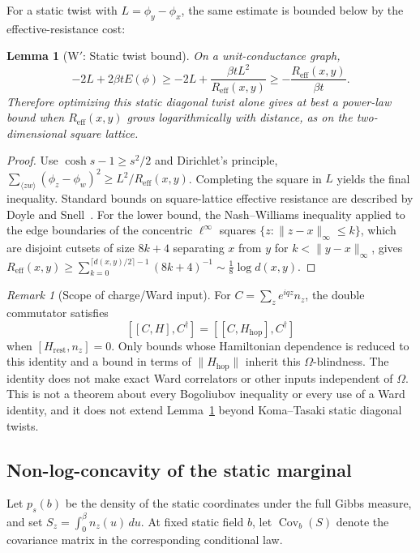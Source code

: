 \documentclass[11pt]{article}
\newtheorem{lemma}[theorem]{Lemma}
\theoremstyle{definition}
\theoremstyle{remark}
\newtheorem{remark}[theorem]{Remark}
\newcommand{\eff}{\mathrm{eff}}
\begin{document}
For a static twist with $L=\phi_y-\phi_x$, the same estimate is bounded below by the effective-resistance cost:
\begin{lemma}[W$'$: Static twist bound]\label{lem:Wprime}
On a unit-conductance graph,
\[
 -2L+2\beta tE(\phi)
 \geq -2L+\frac{\beta tL^2}{R_{\eff}(x,y)}
 \geq-\frac{R_{\eff}(x,y)}{\beta t}.
\]
Therefore optimizing this static diagonal twist alone gives at best a power-law bound when $R_{\eff}(x,y)$ grows logarithmically with distance, as on the two-dimensional square lattice.
\end{lemma}

\begin{proof}
Use $\cosh s-1\geq s^2/2$ and Dirichlet's principle, $\sum_{\langle zw\rangle}(\phi_z-\phi_w)^2\geq L^2/R_{\eff}(x,y)$. Completing the square in $L$ yields the final inequality. Standard bounds on square-lattice effective resistance are described by Doyle and Snell~\cite{doyleSnell}. For the lower bound, the Nash--Williams inequality applied to the edge boundaries of the concentric $\ell^\infty$ squares $\{z:\|z-x\|_\infty\leq k\}$, which are disjoint cutsets of size $8k+4$ separating $x$ from $y$ for $k<\|y-x\|_\infty$, gives $R_{\eff}(x,y)\geq\sum_{k=0}^{\lceil d(x,y)/2\rceil-1}(8k+4)^{-1}\sim\frac18\log d(x,y)$.
\end{proof}

\begin{remark}[Scope of charge/Ward input]
For $C=\sum_z e^{iqz}n_z$, the double commutator satisfies
\[
 [[C,H],C^\dagger]=[[C,H_{\mathrm{hop}}],C^\dagger]
\]
when $[H_{\mathrm{rest}},n_z]=0$. Only bounds whose Hamiltonian dependence is reduced to this identity and a bound in terms of $\|H_{\mathrm{hop}}\|$ inherit this $\Omega$-blindness. The identity does not make exact Ward correlators or other inputs independent of $\Omega$. This is not a theorem about every Bogoliubov inequality or every use of a Ward identity, and it does not extend Lemma~\ref{lem:Wprime} beyond Koma--Tasaki static diagonal twists.
\end{remark}

\subsection{Non-log-concavity of the static marginal}

Let $p_s(b)$ be the density of the static coordinates under the full Gibbs measure, and set $S_z=\int_0^\beta n_z(u)\,du$. At fixed static field $b$, let $\operatorname{Cov}_b(S)$ denote the covariance matrix in the corresponding conditional law.
\end{document}
